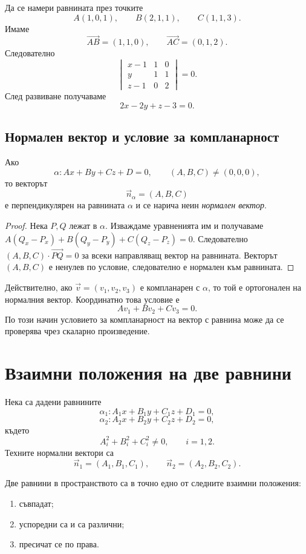 \begin{example}
Да се намери равнината през точките
\[
A(1,0,1),\qquad B(2,1,1),\qquad C(1,1,3).
\]
Имаме
\[
\overrightarrow{AB}=(1,1,0),\qquad
\overrightarrow{AC}=(0,1,2).
\]
Следователно
\[
\begin{vmatrix}
x-1&1&0\\
y&1&1\\
z-1&0&2
\end{vmatrix}=0.
\]
След развиване получаваме
\[
2x-2y+z-3=0.
\]
\end{example}

\subsection{Нормален вектор и условие за компланарност}\label{s:29.2.3}

\begin{prop}
Ако
\[
\alpha:Ax+By+Cz+D=0,\qquad (A,B,C)\ne(0,0,0),
\]
то векторът
\[
\vec n_\alpha=(A,B,C)
\]
е перпендикулярен на равнината $\alpha$ и се нарича неин \emph{нормален вектор}.
\end{prop}

\begin{proof}
Нека $P,Q$ лежат в $\alpha$. Изваждаме уравненията им и получаваме $A(Q_x-P_x)+B(Q_y-P_y)+C(Q_z-P_z)=0$. Следователно $(A,B,C)\cdot\overrightarrow{PQ}=0$ за всеки направляващ вектор на равнината. Векторът $(A,B,C)$ е ненулев по условие, следователно е нормален към равнината.
\end{proof}

Действително, ако $\vec v=(v_1,v_2,v_3)$ е компланарен с $\alpha$, то той е ортогонален на нормалния вектор. Координатно това условие е
\[
\boxed{Av_1+Bv_2+Cv_3=0.}
\]
По този начин условието за компланарност на вектор с равнина може да се проверява чрез скаларно произведение.

\section{Взаимни положения на две равнини}\label{s:29.3}

Нека са дадени равнините
\[
\alpha_1:A_1x+B_1y+C_1z+D_1=0,
\]
\[
\alpha_2:A_2x+B_2y+C_2z+D_2=0,
\]
където
\[
A_i^2+B_i^2+C_i^2\ne0,\qquad i=1,2.
\]
Техните нормални вектори са
\[
\vec n_1=(A_1,B_1,C_1),\qquad
\vec n_2=(A_2,B_2,C_2).
\]

\begin{keythm}
Две равнини в пространството са в точно едно от следните взаимни положения:

\begin{enumerate}
\item съвпадат;
\item успоредни са и са различни;
\item пресичат се по права.
\end{enumerate}
\end{keythm}

